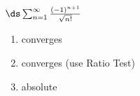 {$\ds \sum_{n=1}^\infty \frac{(-1)^{n+1}}{\sqrt{n!}}$
}
{\begin{enumerate}
	\item converges
	\item	converges (use Ratio Test)
	\item absolute
\end{enumerate}
}